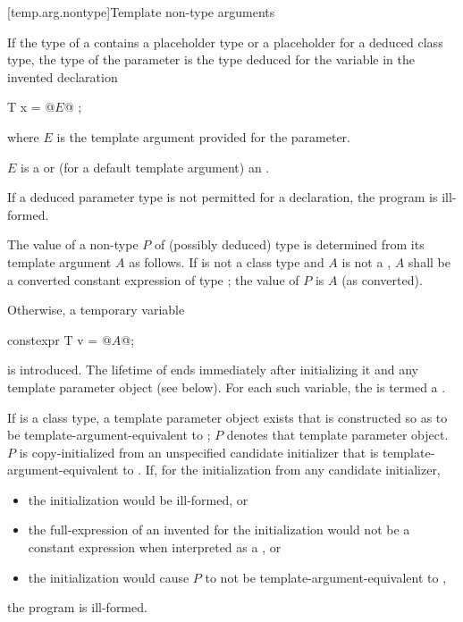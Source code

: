 [temp.arg.nontype]{Template non-type arguments}

\pnum
If the type  of a 
contains a placeholder type
or a placeholder for a deduced class type,
the type of the parameter is the type deduced
for the variable  in the invented declaration
\begin{codeblock}
T x = @$E$@ ;
\end{codeblock}
where $E$ is the template argument provided for the parameter.
\begin{note}
$E$ is a  or
(for a default template argument) an .
\end{note}
If a deduced parameter type is not permitted
for a  declaration,
the program is ill-formed.

\pnum
The value of a non-type  $P$
of (possibly deduced) type 
is determined from its template argument $A$ as follows.
If  is not a class type and
$A$ is not a ,
$A$ shall be a converted constant expression
of type ; the value of $P$ is $A$ (as converted).

\pnum
Otherwise, a temporary variable
\begin{codeblock}
constexpr T v = @$A$@;
\end{codeblock}
is introduced.
The lifetime of  ends immediately after initializing it and
any template parameter object (see below).
For each such variable,
the  
is termed a .

\pnum
If  is a class type,
a template parameter object exists
that is constructed so as to be template-argument-equivalent to ;
$P$ denotes that template parameter object.
$P$ is copy-initialized from an unspecified candidate initializer
that is template-argument-equivalent to .
If, for the initialization from any candidate initializer,
\begin{itemize}
\item
the initialization would be ill-formed, or
\item
the full-expression of an invented 
for the initialization would not be a constant expression
when interpreted as a , or
\item
the initialization would cause $P$ to not be template-argument-equivalent to ,
\end{itemize}
the program is ill-formed.

